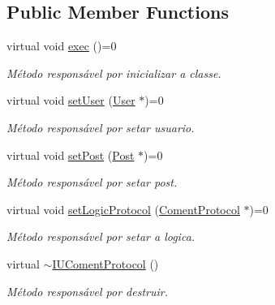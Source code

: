 \subsection*{Public Member Functions}
\begin{DoxyCompactItemize}
\item 
\hypertarget{class_i_u_coment_protocol_a202b5ccdb50cdbb4e5d91e00c0a5b36f}{virtual void \hyperlink{class_i_u_coment_protocol_a202b5ccdb50cdbb4e5d91e00c0a5b36f}{exec} ()=0}\label{class_i_u_coment_protocol_a202b5ccdb50cdbb4e5d91e00c0a5b36f}

\begin{DoxyCompactList}\small\item\em Método responsável por inicializar a classe. \end{DoxyCompactList}\item 
\hypertarget{class_i_u_coment_protocol_aaad948b88a118ea0f26cdce48211abb4}{virtual void \hyperlink{class_i_u_coment_protocol_aaad948b88a118ea0f26cdce48211abb4}{set\-User} (\hyperlink{class_user}{User} $\ast$)=0}\label{class_i_u_coment_protocol_aaad948b88a118ea0f26cdce48211abb4}

\begin{DoxyCompactList}\small\item\em Método responsável por setar usuario. \end{DoxyCompactList}\item 
\hypertarget{class_i_u_coment_protocol_a5107e906127664a4fe5f0ccc884e58b1}{virtual void \hyperlink{class_i_u_coment_protocol_a5107e906127664a4fe5f0ccc884e58b1}{set\-Post} (\hyperlink{class_post}{Post} $\ast$)=0}\label{class_i_u_coment_protocol_a5107e906127664a4fe5f0ccc884e58b1}

\begin{DoxyCompactList}\small\item\em Método responsável por setar post. \end{DoxyCompactList}\item 
\hypertarget{class_i_u_coment_protocol_a8ea2f52fd6f7432b6af223f86191e625}{virtual void \hyperlink{class_i_u_coment_protocol_a8ea2f52fd6f7432b6af223f86191e625}{set\-Logic\-Protocol} (\hyperlink{class_coment_protocol}{Coment\-Protocol} $\ast$)=0}\label{class_i_u_coment_protocol_a8ea2f52fd6f7432b6af223f86191e625}

\begin{DoxyCompactList}\small\item\em Método responsável por setar a logica. \end{DoxyCompactList}\item 
\hypertarget{class_i_u_coment_protocol_a1aadca361174f80e6b76448bc4b3f744}{virtual \hyperlink{class_i_u_coment_protocol_a1aadca361174f80e6b76448bc4b3f744}{$\sim$\-I\-U\-Coment\-Protocol} ()}\label{class_i_u_coment_protocol_a1aadca361174f80e6b76448bc4b3f744}

\begin{DoxyCompactList}\small\item\em Método responsável por destruir. \end{DoxyCompactList}\end{DoxyCompactItemize}


